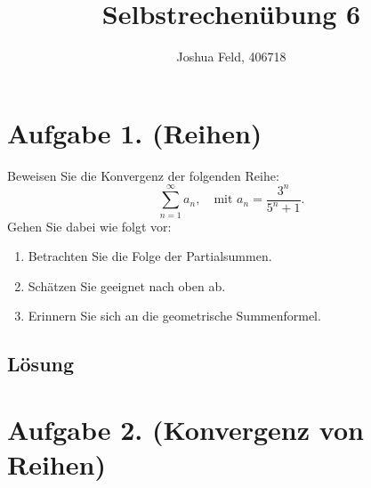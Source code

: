 \documentclass[german,12pt]{homework}
\title{Selbstrechenübung 6}
\author{Joshua Feld, 406718}
\institute{RWTH Aachen University\\Center for Computational Engineering Science}
\begin{document}
    \maketitle

    \section*{Aufgabe 1. (Reihen)}

    \begin{problem}
        Beweisen Sie die Konvergenz der folgenden Reihe:
        \[\sum_{n = 1}^\infty{a_n}, \quad \text{mit }a_n = \frac{3^n}{5^n + 1}.\]
        Gehen Sie dabei wie folgt vor:
        \begin{enumerate}
            \item Betrachten Sie die Folge der Partialsummen.
            \item Schätzen Sie geeignet nach oben ab.
            \item Erinnern Sie sich an die geometrische Summenformel.
        \end{enumerate}
    \end{problem}

    \subsection*{Lösung}

    \section*{Aufgabe 2. (Konvergenz von Reihen)}
\end{document}
